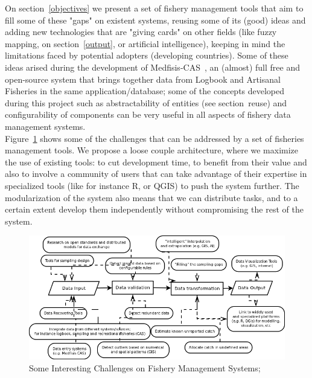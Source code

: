 \documentclass[11pt]{article} %
\begin{document}
On section~\ref{objectives} we present a set of fishery management tools that aim to fill some of these "gaps" on existent systems, reusing some of its (good) ideas and adding new technologies that are "giving cards" on other fields (like fuzzy mapping, on section~\ref{output}, or artificial intelligence), keeping in mind the limitations faced by potential adopters (developing countries). Some of these ideas arised during the development of Medfisis-CAS~\cite{medfisis}, an (almost) full free and open-source system that brings together data from Logbook and Artisanal Fisheries in the same application/database; some of the concepts developed during this project such as abstractability of entities (see section~{reuse}) and configurability of components can be very useful in all aspects of fishery data management systems.\\
Figure~\ref{challenges} shows some of the challenges that can be addressed by a set of fisheries management tools. We propose a loose couple architecture, where we maximize the use of existing tools: to cut development time, to benefit from their value and also to involve a community of users that can take advantage of their expertise in specialized tools (like for instance R, or QGIS) to push the system further. The modularization of the system also means that we can distribute tasks, and to a certain extent develop them independently without compromising the rest of the system.\\


  \begin{figure}[!ht]%
    \begin{center} 
	\includegraphics[width=\textwidth ]{challenges_cas}
      \caption[Some Interesting Challenges on Fishery Management Systems;]{Some Interesting Challenges on Fishery Management Systems;}
      \label{challenges} %
    \end{center} 
  \end{figure}
\end{document}

